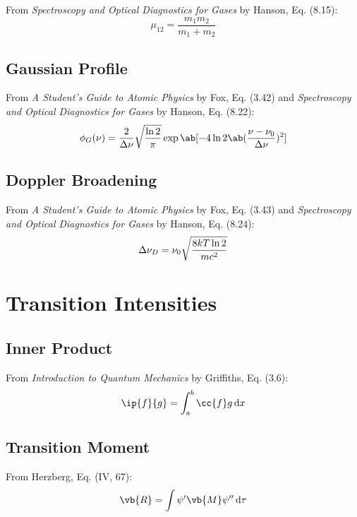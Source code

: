 \documentclass[11pt, twoside, fleqn]{report}
\begin{document}
From \textit{Spectroscopy and Optical Diagnostics for Gases} by Hanson, Eq. (8.15):
\begin{equation*}
    \mu_{12} = \frac{m_1m_2}{m_1 + m_2}
\end{equation*}

\subsection{Gaussian Profile}

From \textit{A Student's Guide to Atomic Physics} by Fox, Eq. (3.42) and \textit{Spectroscopy and Optical Diagnostics for Gases} by Hanson, Eq. (8.22):
\begin{equation*}
    \phi_G(\nu) = \frac{2}{\adif{\nu}}\sqrt{\frac{\ln{2}}{\pi}}\exp\ab[-4\ln{2}\ab(\frac{\nu - \nu_0}{\adif{\nu}})^2]
\end{equation*}

\subsection{Doppler Broadening}

From \textit{A Student's Guide to Atomic Physics} by Fox, Eq. (3.43) and \textit{Spectroscopy and Optical Diagnostics for Gases} by Hanson, Eq. (8.24):
\begin{equation*}
    \adif{\nu}_D = \nu_0\sqrt{\frac{8kT\ln{2}}{mc^2}}
\end{equation*}

\section{Transition Intensities}

\subsection{Inner Product}

From \textit{Introduction to Quantum Mechanics} by Griffiths, Eq. (3.6):
\begin{equation*}
    \ip{f}{g} = \int_a^b \cc{f}g \odif{x}
\end{equation*}

\subsection{Transition Moment}

From Herzberg, Eq. (IV, 67):
\begin{equation*}
    \vb{R} = \int \psi'\vb{M}\psi'' \odif{\tau}
\end{equation*}
\end{document}
